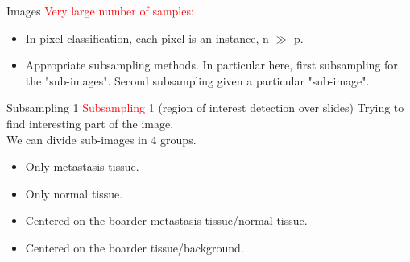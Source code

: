 \documentclass{beamer}
\begin{document}
\begin{frame}{Images}
\textcolor{red}{Very large number of samples:}
\begin{itemize}
\item In pixel classification, each pixel is an instance, n $\gg$ p.
\item Appropriate subsampling methods. In particular here, first subsampling for the "sub-images". Second subsampling given a particular "sub-image".
\end{itemize}
\end{frame}


\begin{frame}{Subsampling 1}
\textcolor{red}{Subsampling 1} (region of interest detection over slides)
Trying to find interesting part of the image. \\
We can divide sub-images in 4 groups.
\begin{itemize}
\item Only metastasis tissue.
\item Only normal tissue.
\item Centered on the boarder metastasis tissue/normal tissue.
\item Centered on the boarder tissue/background.
\end{itemize}
\end{frame}
\end{document}
